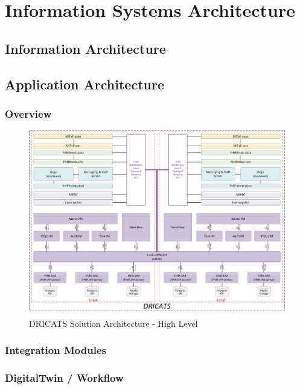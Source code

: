 \documentclass[a4paper]{book}
\begin{document}
\part{Information Systems Architecture}
\chapter{Information Architecture}

\chapter{Application Architecture}
\section{Overview}

\begin{figure}[h!]
	\begin{adjustbox}{max size={0.98\textwidth}{0.9\textheight}, center}
		\includegraphics[]{diagrams/DRICATS-DesignOverview.png}
	\end{adjustbox}
	\caption{DRICATS Solution Architecture - High Level}
\end{figure}

\section{Integration Modules}

\section{DigitalTwin / Workflow}
\end{document}
